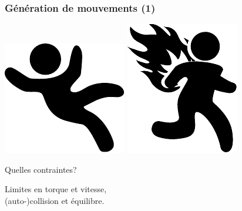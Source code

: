 \documentclass[14pt,utf8x,hyperref={pdfpagelabels=false}]{beamer}
\begin{document}
\begin{slideDecision}
  \frametitle{Génération de mouvements (1)}
  \begin{changeleftmargin}{1.1cm}
  \begin{center}
    \includegraphics[width=.25\paperheight]{src/slides/falling.pdf}%
    \includegraphics[width=.25\paperheight]{src/slides/burning.pdf}\par
    \bigskip
    Quelles contraintes?\par
  \end{center}
  Limites en torque et vitesse,\\
  (auto-)collision et \alert{équilibre}.
  \end{changeleftmargin}
\end{slideDecision}
\end{document}
